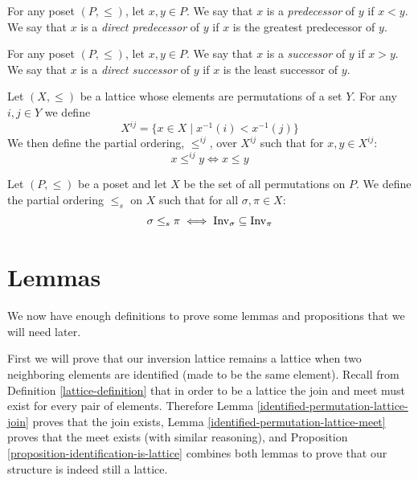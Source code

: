 	\begin{definition}
		For any poset $(P, \le)$, let $x,y \in P$. We say that $x$ is a \emph{predecessor} of $y$ if $x < y$. We say that $x$ is a \emph{direct predecessor} of $y$ if $x$ is the greatest predecessor of $y$.
	\end{definition}

	\begin{definition}
		For any poset $(P, \le)$, let $x,y \in P$. We say that $x$ is a \emph{successor} of $y$ if $x > y$. We say that $x$ is a \emph{direct successor} of $y$ if $x$ is the least successor of $y$.
	\end{definition}

	\begin{definition}[$X^{ij}, \le^{ij}$]
		Let $(X, \le)$ be a lattice whose elements are permutations of a set $Y$. For any $i,j \in Y$ we define
		\[
			X^{ij} = \{ x \in X \mid x^{-1}(i) < x^{-1}(j) \}
		\]
		We then define the partial ordering, $\le^{ij}$, over $X^{ij}$ such that for $x, y \in X^{ij}$:
		\[
			x \le^{ij} y \iff x \le y
		\]
	\end{definition}

	\begin{definition}[$\le_s$]
		Let $(P, \le)$ be a poset and let $X$ be the set of all permutations on $P$. We define the partial ordering $\le_s$ on $X$ such that for all $\sigma, \pi \in X$:
		\[
			\sigma \le_s \pi \iff \operatorname{Inv}_{\sigma} \subseteq \operatorname{Inv}_{\pi}
		\]
	\end{definition}



\section{Lemmas}

	We now have enough definitions to prove some lemmas and propositions that we will need later.

	First we will prove that our inversion lattice remains a lattice when two neighboring elements are identified (made to be the same element). Recall from Definition \ref{lattice-definition} that in order to be a lattice the join and meet must exist for every pair of elements. Therefore Lemma \ref{identified-permutation-lattice-join} proves that the join exists, Lemma \ref{identified-permutation-lattice-meet} proves that the meet exists (with similar reasoning), and Proposition \ref{proposition-identification-is-lattice} combines both lemmas to prove that our structure is indeed still a lattice.

